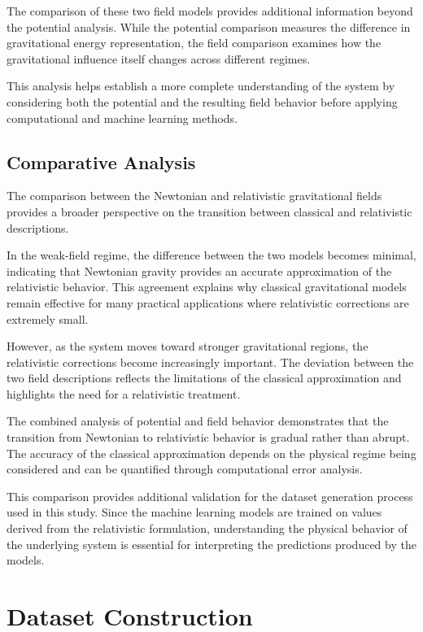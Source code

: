 \documentclass[
]{article}
\begin{document}
The comparison of these two field models provides additional information
beyond the potential analysis. While the potential comparison measures
the difference in gravitational energy representation, the field
comparison examines how the gravitational influence itself changes
across different regimes.

This analysis helps establish a more complete understanding of the
system by considering both the potential and the resulting field
behavior before applying computational and machine learning methods.

\subsection{Comparative Analysis}\label{comparative-analysis}

The comparison between the Newtonian and relativistic gravitational
fields provides a broader perspective on the transition between
classical and relativistic descriptions.

In the weak-field regime, the difference between the two models becomes
minimal, indicating that Newtonian gravity provides an accurate
approximation of the relativistic behavior. This agreement explains why
classical gravitational models remain effective for many practical
applications where relativistic corrections are extremely small.

However, as the system moves toward stronger gravitational regions, the
relativistic corrections become increasingly important. The deviation
between the two field descriptions reflects the limitations of the
classical approximation and highlights the need for a relativistic
treatment.

The combined analysis of potential and field behavior demonstrates that
the transition from Newtonian to relativistic behavior is gradual rather
than abrupt. The accuracy of the classical approximation depends on the
physical regime being considered and can be quantified through
computational error analysis.

This comparison provides additional validation for the dataset
generation process used in this study. Since the machine learning models
are trained on values derived from the relativistic formulation,
understanding the physical behavior of the underlying system is
essential for interpreting the predictions produced by the models.

\section{Dataset Construction}\label{dataset-construction}
\end{document}

